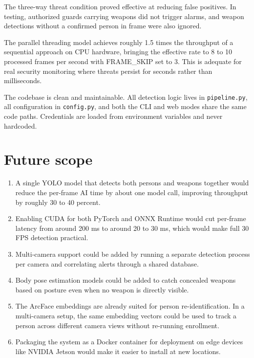 \documentclass[12pt,a4paper]{report}
\begin{document}
The three-way threat condition proved effective at reducing false positives. In testing, authorized guards carrying weapons did not trigger alarms, and weapon detections without a confirmed person in frame were also ignored.

The parallel threading model achieves roughly 1.5 times the throughput of a sequential approach on CPU hardware, bringing the effective rate to 8 to 10 processed frames per second with FRAME\_SKIP set to 3. This is adequate for real security monitoring where threats persist for seconds rather than milliseconds.

The codebase is clean and maintainable. All detection logic lives in \texttt{pipeline.py}, all configuration in \texttt{config.py}, and both the CLI and web modes share the same code paths. Credentials are loaded from environment variables and never hardcoded.

\section{Future scope}

\begin{enumerate}
    \item A single YOLO model that detects both persons and weapons together would reduce the per-frame AI time by about one model call, improving throughput by roughly 30 to 40 percent.

    \item Enabling CUDA for both PyTorch and ONNX Runtime would cut per-frame latency from around 200 ms to around 20 to 30 ms, which would make full 30 FPS detection practical.

    \item Multi-camera support could be added by running a separate detection process per camera and correlating alerts through a shared database.

    \item Body pose estimation models could be added to catch concealed weapons based on posture even when no weapon is directly visible.

    \item The ArcFace embeddings are already suited for person re-identification. In a multi-camera setup, the same embedding vectors could be used to track a person across different camera views without re-running enrollment.

    \item Packaging the system as a Docker container for deployment on edge devices like NVIDIA Jetson would make it easier to install at new locations.
\end{enumerate}
\end{document}
